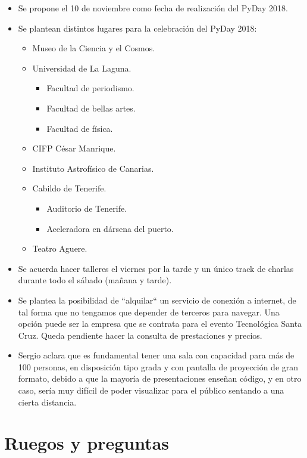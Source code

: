 \documentclass[a4paper, 12pt]{article}
\begin{document}
\begin{itemize}
    \item Se propone el 10 de noviembre como fecha de realización del PyDay 2018.
    \item Se plantean distintos lugares para la celebración del PyDay 2018:
    \begin{itemize}
        \item Museo de la Ciencia y el Cosmos.
        \item Universidad de La Laguna.
            \begin{itemize}
                \item Facultad de periodismo.
                \item Facultad de bellas artes.
                \item Facultad de física.
            \end{itemize}
        \item CIFP César Manrique.
        \item Instituto Astrofísico de Canarias.
        \item Cabildo de Tenerife.
            \begin{itemize}
                \item Auditorio de Tenerife.
                \item Aceleradora en dársena del puerto.
            \end{itemize}
        \item Teatro Aguere.
    \end{itemize}
    \item Se acuerda hacer talleres el viernes por la tarde y un único track de charlas durante todo el sábado (mañana y tarde).
    \item Se plantea la posibilidad de ``alquilar`` un servicio de conexión a internet, de tal forma que no tengamos que depender de terceros para navegar. Una opción puede ser la empresa que se contrata para el evento Tecnológica Santa Cruz. Queda pendiente hacer la consulta de prestaciones y precios.
    \item Sergio aclara que es fundamental tener una sala con capacidad para más de 100 personas, en disposición tipo grada y con pantalla de proyección de gran formato, debido a que la mayoría de presentaciones enseñan código, y en otro caso, sería muy difícil de poder visualizar para el público sentando a una cierta distancia.
\end{itemize}

\section{Ruegos y preguntas}
\end{document}
